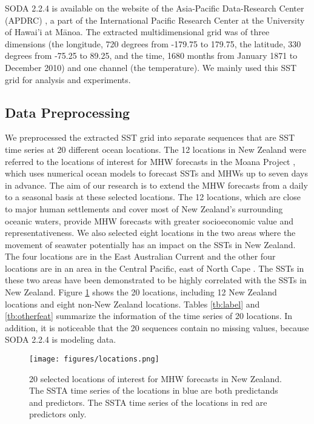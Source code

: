 \documentclass[11pt, a4paper]{article}
\begin{document}
SODA 2.2.4 is available on the website of the Asia-Pacific Data-Research Center (APDRC) \citep{apdrcdataset}, a part of the International Pacific Research Center at the University of Hawai'i at Mānoa. The extracted multidimensional grid was of three dimensions (the longitude, 720 degrees from -179.75 to 179.75, the latitude, 330 degrees from -75.25 to 89.25, and the time, 1680 months from January 1871 to December 2010) and one channel (the temperature). We mainly used this SST grid for analysis and experiments.

\subsection{Data Preprocessing}

We preprocessed the extracted SST grid into separate sequences that are SST time series at 20 different ocean locations. The 12 locations in New Zealand were referred to the locations of interest for MHW forecasts in the Moana Project \citep{moanaproject}, which uses numerical ocean models to forecast SSTs and MHWs up to seven days in advance. The aim of our research is to extend the MHW forecasts from a daily to a seasonal basis at these selected locations. The 12 locations, which are close to major human settlements and cover most of New Zealand's surrounding oceanic waters, provide MHW forecasts with greater socioeconomic value and representativeness. We also selected eight locations in the two areas where the movement of seawater potentially has an impact on the SSTs in New Zealand. The four locations are in the East Australian Current \citep{sutton2019ocean,elzahaby2021oceanic} and the other four locations are in an area in the Central Pacific, east of North Cape \citep{sutton2019ocean}. The SSTs in these two areas have been demonstrated to be highly correlated with the SSTs in New Zealand. Figure \ref{fg:locs} shows the 20 locations, including 12 New Zealand locations and eight non-New Zealand locations. Tables \ref{tb:label} and \ref{tb:otherfeat} summarize the information of the time series of 20 locations. In addition, it is noticeable that the 20 sequences contain no missing values, because SODA 2.2.4 is modeling data.

\begin{figure}[H]
\centering
\texttt{[image: figures/locations.png]}
\caption{20 selected locations of interest for MHW forecasts in New Zealand. The SSTA time series of the locations in blue are both predictands and predictors. The SSTA time series of the locations in red are predictors only.}\label{fg:locs}
\end{figure}
\end{document}
